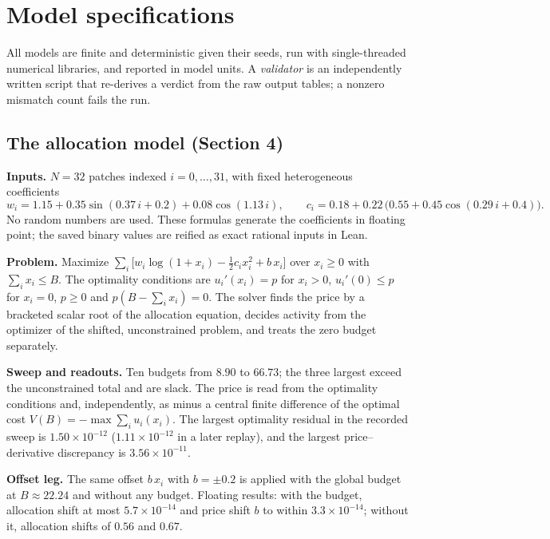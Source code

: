 \hypertarget{appendix-a-model-specifications}{%
\section{Model
specifications}\label{appendix-a-model-specifications}}

All models are finite and deterministic given their seeds, run with
single-threaded numerical libraries, and reported in model units. A
\emph{validator} is an independently written script that re-derives a
verdict from the raw output tables; a nonzero mismatch count fails the
run.

\hypertarget{a.1-the-allocation-model-section-4}{%
\subsection{The allocation model (Section
4)}\label{a.1-the-allocation-model-section-4}}

\textbf{Inputs.} \(N=32\) patches indexed \(i=0,\ldots,31\), with fixed
heterogeneous coefficients
\[w_i=1.15+0.35\sin(0.37\,i+0.2)+0.08\cos(1.13\,i),\qquad c_i=0.18+0.22\,\bigl(0.55+0.45\cos(0.29\,i+0.4)\bigr).\]
No random numbers are used. These formulas generate the coefficients in
floating point; the saved binary values are reified as exact rational
inputs in Lean.

\textbf{Problem.} Maximize
\(\sum_i\bigl[w_i\log(1+x_i)-\tfrac12c_ix_i^2+b\,x_i\bigr]\) over
\(x_i\ge0\) with \(\sum_ix_i\le B\). The optimality conditions are
\(u_i'(x_i)=p\) for \(x_i>0\), \(u_i'(0)\le p\) for \(x_i=0\), \(p\ge0\)
and \(p(B-\sum_ix_i)=0\). The solver finds the price by a bracketed
scalar root of the allocation equation, decides activity from the
optimizer of the shifted, unconstrained problem, and treats the zero
budget separately.

\textbf{Sweep and readouts.} Ten budgets from \(8.90\) to \(66.73\); the
three largest exceed the unconstrained total and are slack. The price is
read from the optimality conditions and, independently, as minus a
central finite difference of the optimal cost
\(V(B)=-\max\sum_iu_i(x_i)\). The largest optimality residual in the
recorded sweep is \(1.50\times10^{-12}\) (\(1.11\times10^{-12}\) in a
later replay), and the largest price--derivative discrepancy is
\(3.56\times10^{-11}\).

\textbf{Offset leg.} The same offset \(b\,x_i\) with \(b=\pm0.2\) is
applied with the global budget at \(B\approx22.24\) and without any
budget. Floating results: with the budget, allocation shift at most
\(5.7\times10^{-14}\) and price shift \(b\) to within
\(3.3\times10^{-14}\); without it, allocation shifts of \(0.56\) and
\(0.67\).

